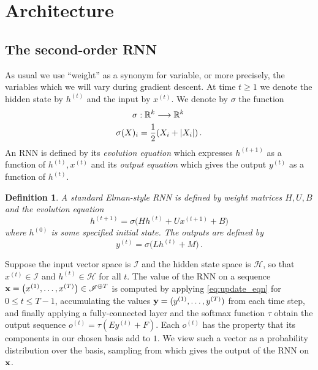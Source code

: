 \documentclass[english,letter paper,12pt,leqno]{article}
\theoremstyle{example}
\newtheorem{definition}[theorem]{Definition}
\numberwithin{equation}{section}
\def\be{\begin{equation}}
\def\ee{\end{equation}}
\begin{document}
\section{Architecture}

\subsection{The second-order RNN}

As usual we use ``weight'' as a synonym for variable, or more precisely, the variables which we will vary during gradient descent. At time $t \ge 1$ we denote the hidden state by $h^{(t)}$ and the input by $x^{(t)}$. We denote by $\sigma$ the function
\begin{gather*}
\sigma: \mathbb{R}^k \longrightarrow \mathbb{R}^k\,\\
\sigma( X )_i = \frac{1}{2}( X_i + |X_i| )\,.
\end{gather*}
An RNN is defined by its \emph{evolution equation} which expresses $h^{(t+1)}$ as a function of $h^{(t)}, x^{(t)}$ and its \emph{output equation} which gives the output $y^{(t)}$ as a function of $h^{(t)}$.

\begin{definition} A standard Elman-style RNN \cite{elman} is defined by weight matrices $H, U, B$ and the evolution equation
\be\label{eq:update_eqn}
h^{(t+1)} = \sigma\big( H h^{(t)} + U x^{(t+1)} + B\big)
\ee
where $h^{(0)}$ is some specified initial state. The outputs are defined by
\be\label{eq:output_rnn}
y^{(t)} = \sigma\big( L h^{(t)} + M \big)\,.
\ee
\end{definition}
Suppose the input vector space is $\mathscr{I}$ and the hidden state space is $\mathscr{H}$, so that $x^{(t)} \in \mathscr{I}$ and $h^{(t)} \in \mathscr{H}$ for all $t$. The value of the RNN on a sequence $\bold{x} = \big( x^{(1)}, \ldots, x^{(T)} \big) \in \mathscr{I}^{\oplus T}$ is computed by applying \eqref{eq:update_eqn} for $0 \le t \le T - 1$, accumulating the values $\bold{y} = (y^{(1)}, \ldots, y^{(T)})$ from each time step, and finally applying a fully-connected layer and the softmax function $\tau$ obtain the output sequence $o^{(t)} = \tau( E y^{(t)} + F )$. Each $o^{(t)}$ has the property that its components in our chosen basis add to $1$. We view such a vector as a probability distribution over the basis, sampling from which gives the output of the RNN on $\bold{x}$.
\\
\end{document}
